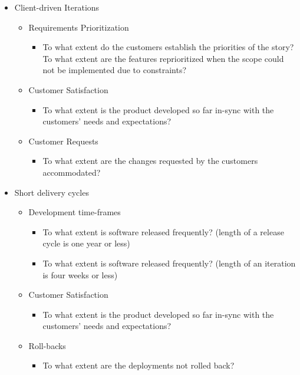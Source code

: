 \begin{appendices}
\begin{itemize}
	\item Client-driven Iterations
		\begin{itemize}
			\item Requirements Prioritization
				\begin{itemize}
					\item To what extent do the customers establish the priorities of the story?
					\addition To what extent are the features reprioritized when the scope could not be implemented due to constraints?
				\end{itemize}
			\item Customer Satisfaction
				\begin{itemize}
					\item To what extent is the product developed so far in-sync with the customers' needs and expectations?
				\end{itemize}
			\item Customer Requests
				\begin{itemize}
					\item To what extent are the changes requested by the customers accommodated?
				\end{itemize}			
		\end{itemize}
	\item Short delivery cycles
		\begin{itemize}
			\item Development time-frames
				\begin{itemize}
					\item To what extent is software released frequently? (length of a release cycle is one year or less)
					\item To what extent is software released frequently? (length of an iteration is four weeks or less)
				\end{itemize}
			\item Customer Satisfaction
				\begin{itemize}
					\item To what extent is the product developed so far in-sync with the customers' needs and expectations?
				\end{itemize}
			\item Roll-backs
				\begin{itemize}
					\item To what extent are the deployments not rolled back?

\end{itemize}
\end{itemize}
\end{itemize}
\end{appendices}
